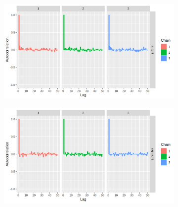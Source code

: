\documentclass[12pt]{article}
\begin{document}
\begin{figure}[h!]
    \centering
    \begin{subfigure}{0.45\textwidth}
        \includegraphics[width=\linewidth]{pictures/mod2/mod2autocorr_muint.png}
    \end{subfigure}
    \begin{subfigure}{0.45\textwidth}
        \includegraphics[width=\linewidth]{pictures/mod2/mod2autocorr_sigmaint.png}
    \end{subfigure}


\end{figure}
\end{document}

